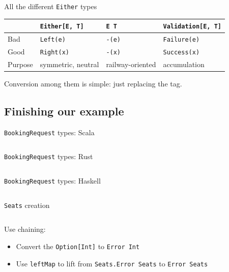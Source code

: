 \begin{frame}{All the different \texttt{Either} types}
  \begin{table}
    \begin{tabular}{| l | l | l | l |}
      \toprule
        & \texttt{Either[E, T]}
        & \texttt{E \/ T}
        & \texttt{Validation[E, T]} \\
      \midrule
      Bad & \texttt{Left(e)}
          & \texttt{-\/(e)}
          &\texttt{Failure(e)} \\
      Good & \texttt{Right(x)}
           & \texttt{\/-(x)}
           & \texttt{Success(x)} \\
      \midrule
      Purpose & symmetric, neutral
              & railway-oriented
              & accumulation \\
      \bottomrule
    \end{tabular}
  \end{table}

  Conversion among them is simple: just replacing the tag.
\end{frame}

\subsection{Finishing our example}

\begin{frame}{\texttt{BookingRequest} types: Scala}
  \inputminted{scala}{BookingRequestTypes.scala}
\end{frame}

\begin{frame}{\texttt{BookingRequest} types: Rust}
  \inputminted{rust}{booking_request_types.rs}
\end{frame}

\begin{frame}{\texttt{BookingRequest} types: Haskell}
  \inputminted{haskell}{BookingRequestTypes.hs}
\end{frame}

\begin{frame}{\texttt{Seats} creation}
  \inputminted{scala}{BookingRequestFactorySeats.scala}

  Use chaining:
  \begin{itemize}
  \item Convert the \texttt{Option[Int]} to
    \texttt{Error \/ Int}
  \item Use \texttt{leftMap} to lift from
    \texttt{Seats.Error \/ Seats} to
    \texttt{Error \/ Seats}
  \end{itemize}
\end{frame}

